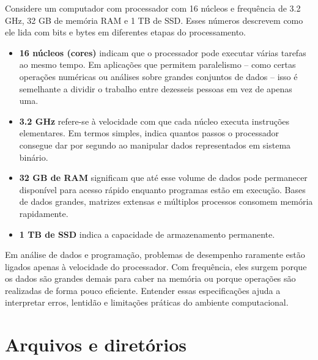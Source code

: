 \documentclass[
  brazilian,
  letterpaper,
  DIV=11,
  numbers=noendperiod]{scrreprt}
\begin{document}
\begin{tcolorbox}[enhanced jigsaw, breakable, coltitle=black, title=\textcolor{quarto-callout-tip-color}{\faLightbulb}\hspace{0.5em}{O que significam as especificações do seu computador?}, titlerule=0mm, colbacktitle=quarto-callout-tip-color!10!white, opacitybacktitle=0.6, arc=.35mm, bottomrule=.15mm, toptitle=1mm, opacityback=0, colback=white, bottomtitle=1mm, toprule=.15mm, rightrule=.15mm, left=2mm, colframe=quarto-callout-tip-color-frame, leftrule=.75mm]

Considere um computador com processador com 16 núcleos e frequência de
3.2 GHz, 32 GB de memória RAM e 1 TB de SSD. Esses números descrevem
como ele lida com bits e bytes em diferentes etapas do processamento.

\begin{itemize}
\item
  \textbf{16 núcleos (cores)} indicam que o processador pode executar
  várias tarefas ao mesmo tempo. Em aplicações que permitem paralelismo
  -- como certas operações numéricas ou análises sobre grandes conjuntos
  de dados -- isso é semelhante a dividir o trabalho entre dezesseis
  pessoas em vez de apenas uma.
\item
  \textbf{3.2 GHz} refere-se à velocidade com que cada núcleo executa
  instruções elementares. Em termos simples, indica quantos passos o
  processador consegue dar por segundo ao manipular dados representados
  em sistema binário.
\item
  \textbf{32 GB de RAM} significam que até esse volume de dados pode
  permanecer disponível para acesso rápido enquanto programas estão em
  execução. Bases de dados grandes, matrizes extensas e múltiplos
  processos consomem memória rapidamente.
\item
  \textbf{1 TB de SSD} indica a capacidade de armazenamento permanente.
\end{itemize}

Em análise de dados e programação, problemas de desempenho raramente
estão ligados apenas à velocidade do processador. Com frequência, eles
surgem porque os dados são grandes demais para caber na memória ou
porque operações são realizadas de forma pouco eficiente. Entender essas
especificações ajuda a interpretar erros, lentidão e limitações práticas
do ambiente computacional.

\end{tcolorbox}

\section{Arquivos e diretórios}\label{arquivos-e-diretuxf3rios}
\end{document}
